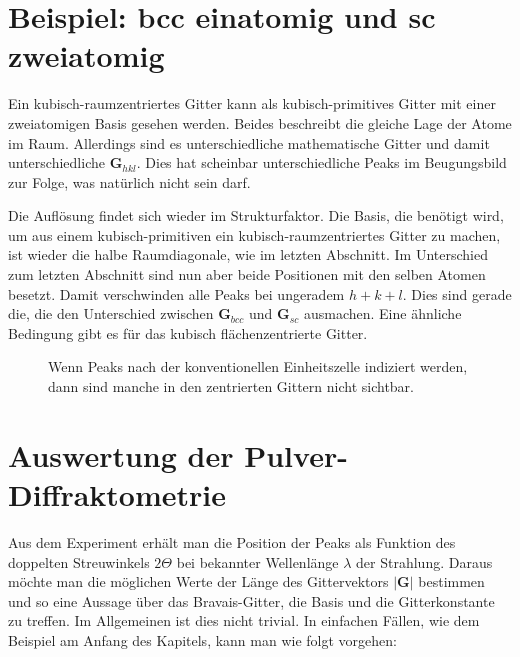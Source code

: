 \section{Beispiel: bcc einatomig und sc zweiatomig}

Ein kubisch-raumzentriertes Gitter  kann als kubisch-primitives Gitter mit einer zweiatomigen Basis gesehen werden. Beides beschreibt die gleiche Lage der Atome im Raum. Allerdings sind es unterschiedliche mathematische Gitter und damit unterschiedliche $\mathbf{G}_{hkl}$. Dies hat scheinbar unterschiedliche Peaks im Beugungsbild zur Folge, was natürlich nicht sein darf.

Die Auflösung findet sich wieder im Strukturfaktor. Die Basis, die benötigt wird, um aus einem  kubisch-primitiven ein kubisch-raumzentriertes Gitter  zu machen, ist wieder die halbe Raumdiagonale, wie im letzten Abschnitt. Im Unterschied zum letzten Abschnitt sind nun aber beide Positionen mit den selben Atomen besetzt. Damit verschwinden alle Peaks bei ungeradem $ h+k+l $. Dies sind gerade die, die den Unterschied zwischen $\mathbf{G}_{bcc} $ und  $\mathbf{G}_{sc} $ ausmachen. Eine ähnliche Bedingung gibt es für das kubisch flächenzentrierte Gitter.


\begin{figure}
  \caption{Wenn Peaks nach der konventionellen Einheitszelle indiziert werden, dann sind manche in den zentrierten Gittern nicht sichtbar. }
\end{figure}


\section{Auswertung der Pulver-Diffraktometrie}

Aus dem Experiment erhält man die Position der Peaks als Funktion des doppelten Streuwinkels $2\Theta$ bei bekannter Wellenlänge $\lambda$ der Strahlung. Daraus möchte man die möglichen Werte der Länge des Gittervektors $|\mathbf{G}|$ bestimmen und so eine Aussage über das Bravais-Gitter, die Basis und die Gitterkonstante zu treffen. Im Allgemeinen ist dies nicht trivial. In einfachen Fällen, wie dem Beispiel am Anfang des Kapitels, kann man wie folgt vorgehen:

